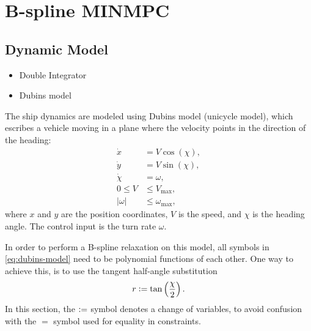 
\chapter{B-spline MINMPC}\label{chap:b-spline-minmpc}

\section{Dynamic Model}
\begin{itemize}
    \item Double Integrator
    \item Dubins model
\end{itemize}

The ship dynamics are modeled using Dubins model (unicycle model), which escribes a vehicle moving in a plane where the velocity points in the direction of the heading:
\begin{subequations}\label{eq:dubins-model}
    \begin{align}
        \dot x &= V \cos(\chi),       \label{eq:dubins-x} \\
        \dot y &= V \sin(\chi),       \label{eq:dubins-y} \\
        \dot \chi &= \omega,          \label{eq:dubins-chi} \\
        0 \leq V &\leq V_{\max},      \label{eq:dubins-V} \\
        |\omega| &\leq \omega_{\max}, \label{eq:dubins-omega}
    \end{align}
\end{subequations}
where $x$ and $y$ are the position coordinates, $V$ is the speed, and $\chi$ is the heading angle. The control input is the turn rate $\omega$.

In order to perform a B-spline relaxation on this model, all symbols in \cref{eq:dubins-model} need to be polynomial functions of each other. One way to  achieve this, is to use the tangent half-angle substitution
\begin{equation}\label{eq:tangent-half-angle}
    r \vcentcolon= \tan\left(\frac{\chi}{2}\right).
\end{equation}
In this section, the $\vcentcolon=$ symbol denotes a change of variables, to avoid confusion with the $=$ symbol used for equality in constraints. 

